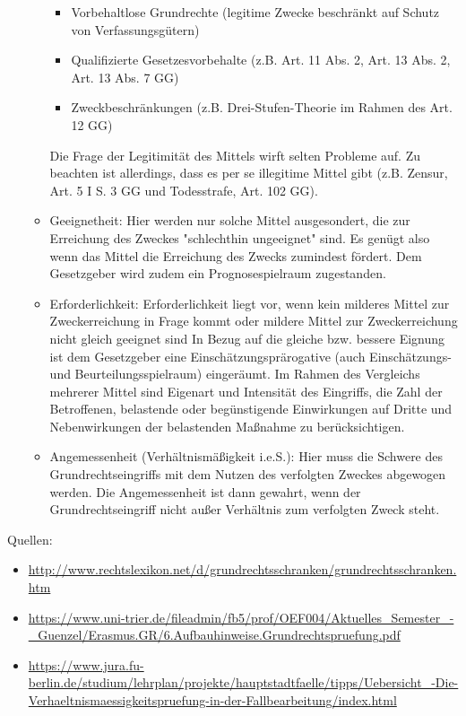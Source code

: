 \documentclass{article}
\begin{document}
\begin{enumerate}[label=(\alph*)]
\begin{itemize}
\begin{itemize}
				\item Vorbehaltlose Grundrechte (legitime Zwecke beschränkt auf Schutz von Verfassungsgütern)
				\item Qualifizierte Gesetzesvorbehalte (z.B. Art. 11 Abs. 2, Art. 13 Abs. 2, Art. 13 Abs. 7 GG)
				\item Zweckbeschränkungen (z.B. Drei-Stufen-Theorie im Rahmen des Art. 12 GG)
			\end{itemize}
			Die Frage der Legitimität des Mittels wirft selten Probleme auf. Zu beachten ist allerdings, dass es per se illegitime Mittel gibt (z.B. Zensur, Art. 5 I S. 3 GG und Todesstrafe, Art. 102 GG).
			\item Geeignetheit: Hier werden nur solche Mittel ausgesondert, die zur Erreichung des Zweckes "schlechthin ungeeignet" sind. Es genügt also wenn das Mittel die Erreichung des Zwecks zumindest fördert. Dem Gesetzgeber wird zudem ein Prognosespielraum zugestanden.
			\item Erforderlichkeit: Erforderlichkeit liegt vor, wenn kein milderes Mittel zur Zweckerreichung in Frage kommt oder mildere Mittel zur Zweckerreichung nicht gleich geeignet sind In Bezug auf die gleiche bzw. bessere Eignung ist dem Gesetzgeber eine Einschätzungsprärogative (auch Einschätzungs- und Beurteilungsspielraum) eingeräumt. Im Rahmen des Vergleichs mehrerer Mittel sind Eigenart und Intensität des Eingriffs, die Zahl der Betroffenen, belastende oder begünstigende Einwirkungen auf Dritte und Nebenwirkungen der belastenden Maßnahme zu berücksichtigen.
			\item Angemessenheit (Verhältnismäßigkeit i.e.S.): Hier muss die Schwere des Grundrechtseingriffs mit dem Nutzen des verfolgten Zweckes abgewogen werden. Die Angemessenheit ist dann gewahrt, wenn der Grundrechtseingriff nicht außer Verhältnis zum verfolgten Zweck steht.
		\end{itemize}
	\end{enumerate}

	Quellen:
	\begin{itemize}
		\item \url{http://www.rechtslexikon.net/d/grundrechtsschranken/grundrechtsschranken.htm}
		\item \url{https://www.uni-trier.de/fileadmin/fb5/prof/OEF004/Aktuelles_Semester_-_Guenzel/Erasmus.GR/6.Aufbauhinweise.Grundrechtspruefung.pdf}
		\item \url{https://www.jura.fu-berlin.de/studium/lehrplan/projekte/hauptstadtfaelle/tipps/Uebersicht_-Die-Verhaeltnismaessigkeitspruefung-in-der-Fallbearbeitung/index.html}
	\end{itemize}
\end{document}
